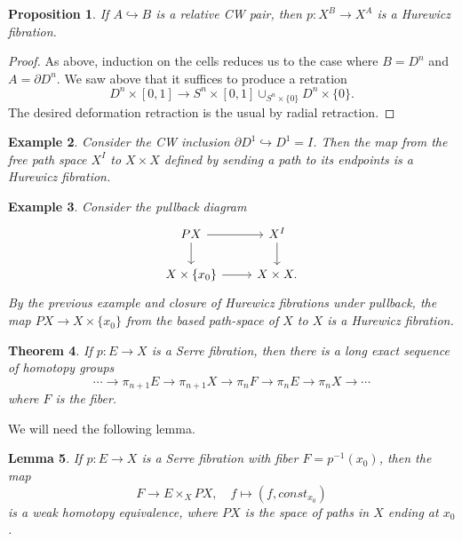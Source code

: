 \documentclass{article}
\newtheorem{theorem}{Theorem}[section]
\newtheorem{proposition}[theorem]{Proposition}
\newtheorem{lemma}[theorem]{Lemma}
\newtheorem{example}[theorem]{Example}
\newtheorem{proposed work}[theorem]{Proposed Work}
\begin{document}
\begin{proposition}
If $A \hookrightarrow B$ is a relative CW pair, then $p : X^B \to X^A$ is a Hurewicz fibration.
\end{proposition}

\begin{proof}
As above, induction on the cells reduces us to the case where $B = D^n$ and $A = \partial D^n$. We saw above that it suffices to produce a retration 
$$D^n \times [0,1] \to S^n \times [0,1] \cup_{S^n \times \{0\}} D^n \times \{0\}.$$
The desired deformation retraction is the usual by radial retraction. 
\end{proof}

\begin{example}
Consider the CW inclusion $\partial D^1 \hookrightarrow D^1 = I$. Then the map from the free path space $X^I$ to $X \times X$ defined by sending a path to its endpoints is a Hurewicz fibration. 
\end{example}

\begin{example}
Consider the pullback diagram
\[
\begin{tikzcd}
PX \arrow[r] \arrow[d] & X^I \arrow[d] \\
X \times \{x_0\} \arrow[r] & X \times X.
\end{tikzcd}
\]
By the previous example and closure of Hurewicz fibrations under pullback, the map $PX \to X \times \{x_0\}$ from the based path-space of $X$ to $X$ is a Hurewicz fibration. 
\end{example}

\begin{theorem} \label{thm:serre-les}
If $p : E \to X$ is a Serre fibration, then there is a long exact sequence of homotopy groups
$$ \cdots \to \pi_{n+1} E \to \pi_{n+1} X \to \pi_n F \to \pi_n E \to \pi_n X \to \cdots$$
where $F$ is the fiber.
\end{theorem}

We will need the following lemma.

\begin{lemma}
  If $p : E \to X$ is a Serre fibration with fiber $F = p^{-1}(x_0)$,
  then the map
  $$F \to E \times_X PX, \quad  f \mapsto (f,const_{x_0})$$
  is a weak homotopy equivalence, where $PX$ is the space of paths in
  $X$ ending at $x_0$. 
\end{lemma}
\end{document}
